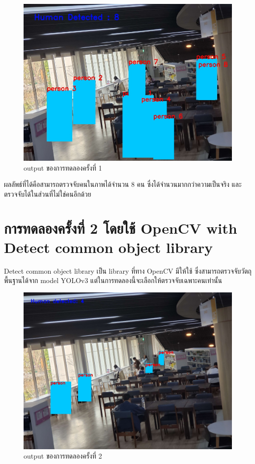 \begin{figure}[ht]
    \centering
    \includegraphics[scale=0.35]{images/hog_output.jpg}
    \caption[output 1]{output ของการทดลองครั้งที่ 1}
    \label{fig:output1}
    \end{figure}

\hspace{10mm} ผลลัพธ์ที่ได้คือสามารถตรวจจับคนในภาพได้จำนวน 8 คน ซึ่งได้จำนวนมากกว่าความเป็นจริง และตรวจจับได้ในส่วนที่ไม่ใช่คนอีกด้วย
\newpage
\section{การทดลองครั้งที่ 2 โดยใช้ OpenCV with Detect common object library}
\hspace{10mm}Detect common object library เป็น library ที่ทาง OpenCV มีให้ใช้ ซึ่งสามารถตรวจจับวัตถุพื้นฐานได้จาก model YOLOv3 แต่ในการทดลองนี้จะเลือกให้ตรวจจับเฉพาะคนเท่านั้น\cite{OpenYOLO}
\begin{figure}[ht]
    \centering
    \includegraphics[scale=0.25]{images/cvlib_output.jpg}
    \caption[output 2]{output ของการทดลองครั้งที่ 2}
    \label{fig:output2}
\end{figure}

